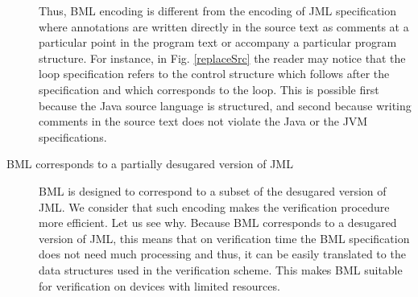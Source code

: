 \begin{description}
	    Thus, BML encoding is different from the encoding of   JML specification where
	    annotations are written directly in the source text as comments
	    at a particular point in the program text or accompany a particular program structure. 
	    For instance, in Fig. \ref{replaceSrc} the
	    reader may notice that the loop specification
	    refers to the control structure which follows after the specification and which corresponds to the loop.
	    This is possible first because
	    the Java source language is structured, and second because writing comments in the source text
	    does not violate the Java or the JVM  specifications. 
	  


\item [BML corresponds to a partially desugared version of JML]

      BML is designed to correspond to a subset of the desugared version of JML.
      We consider that such encoding makes the verification procedure more efficient. 
      Let us see why. Because BML corresponds to a desugared version of JML, this means that on verification time
      the BML specification does not need much processing and thus, it can be easily translated to the
      data structures used in the verification scheme. This makes BML suitable for verification on devices
      with limited resources.
      

\end{description}

